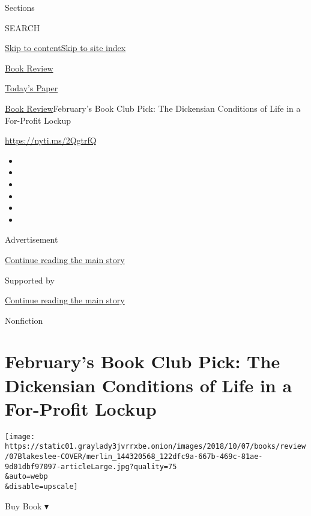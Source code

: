 Sections

SEARCH

\protect\hyperlink{site-content}{Skip to
content}\protect\hyperlink{site-index}{Skip to site index}

\href{https://www.nytimes3xbfgragh.onion/section/books/review}{Book
Review}

\href{https://myaccount.nytimes3xbfgragh.onion/auth/login?response_type=cookie\&client_id=vi}{}

\href{https://www.nytimes3xbfgragh.onion/section/todayspaper}{Today's
Paper}

\href{/section/books/review}{Book Review}\textbar{}February's Book Club
Pick: The Dickensian Conditions of Life in a For-Profit Lockup

\url{https://nyti.ms/2QgtrfQ}

\begin{itemize}
\item
\item
\item
\item
\item
\item
\end{itemize}

Advertisement

\protect\hyperlink{after-top}{Continue reading the main story}

Supported by

\protect\hyperlink{after-sponsor}{Continue reading the main story}

Nonfiction

\hypertarget{februarys-book-club-pick-the-dickensian-conditions-of-life-in-a-for-profit-lockup}{%
\section{February's Book Club Pick: The Dickensian Conditions of Life in
a For-Profit
Lockup}\label{februarys-book-club-pick-the-dickensian-conditions-of-life-in-a-for-profit-lockup}}

\texttt{[image: https://static01.graylady3jvrrxbe.onion/images/2018/10/07/books/review/07Blakeslee-COVER/merlin\_144320568\_122dfc9a-667b-469c-81ae-9d01dbf97097-articleLarge.jpg?quality=75\\\&auto=webp\\\&disable=upscale]}

Buy Book ▾

